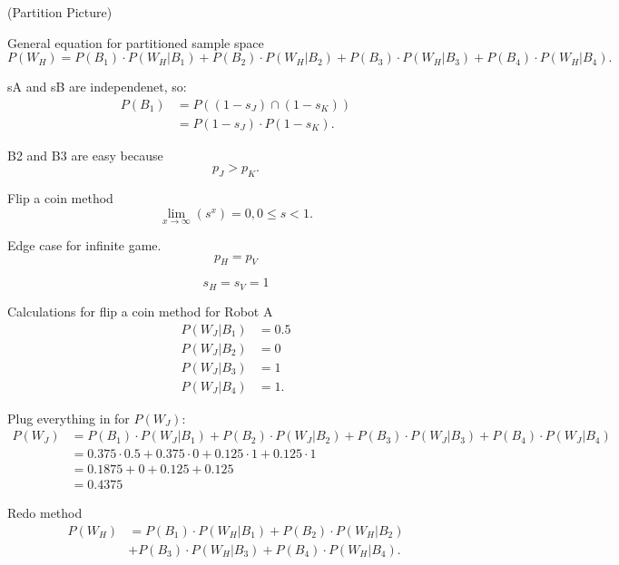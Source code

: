 \documentclass[11pt]{article}
\begin{document}
(Partition Picture)

General equation for partitioned sample space
\begin{equation*}
    P(W_H) = P(B_1) \cdot P(W_H | B_1) + P(B_2) \cdot P(W_H | B_2) + P(B_3) \cdot P(W_H | B_3) + P(B_4) \cdot P(W_H | B_4).
\end{equation*}


sA and sB are independenet, so:
\begin{align*}
    P(B_1) &= P((1-s_J) \cap (1-s_K))\\
    &= P(1-s_J) \cdot P(1-s_K).
\end{align*}

B2 and B3 are easy because
\begin{equation*}
    p_J > p_K.
\end{equation*}


Flip a coin method
\begin{equation*}
    \lim_{x \rightarrow \infty}(s^x) = 0, 0 \leq s < 1.
\end{equation*}

Edge case for infinite game.
\begin{equation*}
    p_{H} = p_{V}
\end{equation*}

\begin{equation*}
    s_H = s_V = 1
\end{equation*}

Calculations for flip a coin method for Robot A
\begin{align*}
    P(W_J | B_1) &= 0.5\\
    P(W_J | B_2) &= 0\\
    P(W_J | B_3) &= 1\\
    P(W_J | B_4) &= 1.
\end{align*}

Plug everything in for \(P(W_J)\):
\begin{align*}
    P(W_J) &= P(B_1) \cdot P(W_J | B_1) + P(B_2) \cdot P(W_J | B_2) + P(B_3) \cdot P(W_J | B_3) + P(B_4) \cdot P(W_J | B_4)\\
    &= 0.375 \cdot 0.5 + 0.375 \cdot 0 + 0.125 \cdot 1 + 0.125 \cdot 1\\ 
    &= 0.1875 + 0 + 0.125 + 0.125\\
    &= 0.4375
\end{align*}



Redo method
\begin{align*}
    P(W_{H})&= P(B_{1}) \cdot P(W_{H} | B_{1}) + P(B_{2}) \cdot P(W_{H} | B_{2}) \\
    &+ P(B_{3}) \cdot P(W_{H} | B_{3}) + P(B_{4}) \cdot P(W_{H} | B_{4}).
\end{align*}
\end{document}
